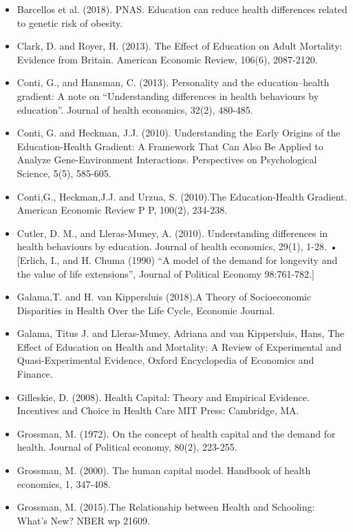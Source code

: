     \begin{itemize}
        \item Barcellos et al. (2018). PNAS. Education can reduce health differences related to genetic risk of obesity.
        \item Clark, D. and Royer, H. (2013). The Effect of Education on Adult Mortality: Evidence from Britain. American Economic Review, 106(6),
        2087-2120.
        \item Conti, G., and Hansman, C. (2013). Personality and the education–health gradient: A note on “Understanding differences in health
        behaviours by education”. Journal of health economics, 32(2), 480-485.
        \item Conti, G. and Heckman, J.J. (2010). Understanding the Early Origins of the Education-Health Gradient: A Framework That Can Also Be Applied to Analyze Gene-Environment Interactions. Perspectives on Psychological Science, 5(5), 585-605.
        \item Conti,G., Heckman,J.J. and Urzua, S. (2010).The Education-Health Gradient. American Economic Review P P, 100(2), 234-238.
        \item Cutler, D. M., and Lleras-Muney, A. (2010). Understanding differences in health behaviours by education. Journal of health economics,
        29(1), 1-28.
        • [Erlich, I., and H. Chuma (1990) “A model of the demand for longevity and the value of life extensions”, Journal of Political Economy
        98:761-782.]
        \item Galama,T. and H. van Kippersluis (2018).A Theory of Socioeconomic Disparities in Health Over the Life Cycle, Economic Journal.
        \item Galama, Titus J. and Lleras-Muney, Adriana and van Kippersluis, Hans, The Effect of Education on Health and Mortality: A Review of
        Experimental and Quasi-Experimental Evidence, Oxford Encyclopedia of Economics and Finance.
        \item Gilleskie, D. (2008). Health Capital: Theory and Empirical Evidence. Incentives and Choice in Health Care MIT Press: Cambridge, MA.
        \item Grossman, M. (1972). On the concept of health capital and the demand for health. Journal of Political economy, 80(2), 223-255.
        \item Grossman, M. (2000). The human capital model. Handbook of health economics, 1, 347-408.
        \item Grossman, M. (2015).The Relationship between Health and Schooling: What’s New? NBER wp 21609.

\end{itemize}
